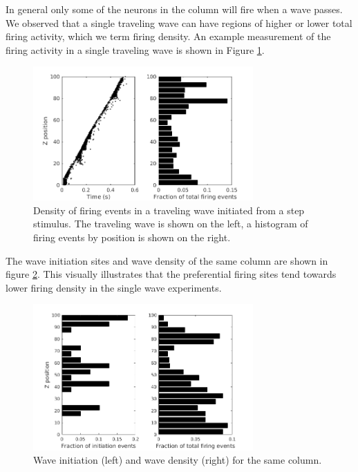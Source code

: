 \documentclass[a4paper,11pt]{article}
\begin{document}
In general only some of the neurons in the column will fire when a wave passes.
We observed that a single traveling wave can have regions of higher or lower total firing activity, which we term firing density.
An example measurement of the firing activity in a single traveling wave is shown in Figure \ref{fig:wave_density}.
\begin{figure}[!htb]
 \caption{Density of firing events in a traveling wave initiated from a step stimulus. The traveling wave is shown on the left, a histogram of firing events by position is shown on the right.}
 \label{fig:wave_density}
 \centering
   \includegraphics[width=0.75\textwidth]{fig/ImpulseWaveDensity}
\end{figure}

The wave initiation sites and wave density of the same column are shown in figure \ref{fig:initiation_density}.
This visually illustrates that the preferential firing sites tend towards lower firing density in the single wave experiments.
\begin{figure}[!htb]
 \caption{Wave initiation (left) and wave density (right) for the same column.}
 \label{fig:initiation_density}
 \centering
   \includegraphics[width=0.75\textwidth]{fig/InitiationCorrelationHistogram}
\end{figure}
\end{document}
